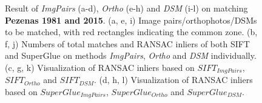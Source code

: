 \begin{figure}[htbp]
\begin{center}
{\begin{minipage}[t]{0.48\linewidth}
            \end{minipage}%
        }
        \caption{{\scriptsize Result of \textit{ImgPairs} (a-d), \textit{Ortho} (e-h) and \textit{DSM} (i-l) on matching \textbf{Pezenas 1981 and 2015}. (a, e, i) Image pairs/orthophotos/DSMs to be matched, with red rectangles indicating the common zone. (b, f, j) Numbers of total matches and RANSAC inliers of both SIFT and SuperGlue on methods \textit{ImgPairs}, \textit{Ortho} and \textit{DSM} individually. (c, g, k) Visualization of RANSAC inliers based on $SIFT_{ImgPairs}$, $SIFT_{Ortho}$ and $SIFT_{DSM}$. (d, h, l) Visualization of RANSAC inliers based on $SuperGlue_{ImgPairs}$, $SuperGlue_{Ortho}$ and $SuperGlue_{DSM}$.}}        
        \label{MatchVizPezenas1981DSM}
    \end{center}
\end{figure} 



